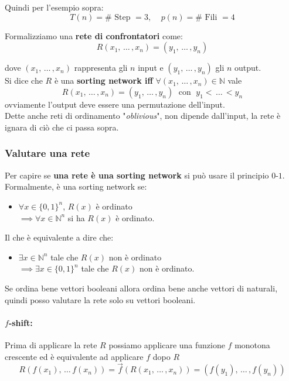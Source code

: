 Quindi per l'esempio sopra:
$$ T(n) = \# \text{ Step } = 3, \;\;\;\; p(n) = \# \text{ Fili } = 4 $$

Formalizziamo una \textbf{rete di confrontatori} come: 
$$ R (x_1, \, \dots \, , x_n) = (y_1, \, \dots \, , y_n) $$

dove $(x_1, \, \dots \, , x_n)$ rappresenta gli $n$ input e $(y_1, \, \dots \, , y_n)$ gli $n$ output.\\

Si dice che $R$ è una \textbf{sorting network iff} $\forall (x_1, \, \dots \, , x_n) \in \mathbb{N}$ vale 
$$ R (x_1, \, \dots \, , x_n) = (y_1, \, \dots \, , y_n) \; \text{ con } \; y_1 < \, \dots \, < y_n $$
ovviamente l'output deve essere una permutazione dell'input.\\

Dette anche reti di ordinamento "\textit{oblivious}", non dipende dall'input, la rete è ignara di ciò che ci passa sopra.\\

\newpage

\subsubsection{Valutare una rete}

Per capire se \textbf{una rete è una sorting network} si può usare il principio $0$-$1$.\\

Formalmente, è una sorting network se: 
\begin{itemize}
	\item $\forall x \in \{0,1\}^n$, $R(x)$ è ordinato\\
	$\implies \forall x \in \mathbb{N}^n$ si ha $R(x)$ è ordinato.\\
\end{itemize}

Il che è equivalente a dire che:
\begin{itemize}
	\item $\exists x \in \mathbb{N}^n$ tale che $R(x)$ non è ordinato\\
	$\implies \exists x \in \{0,1\}^n$ tale che $R(x)$ non è ordinato.\\
\end{itemize}

Se ordina bene vettori booleani allora ordina bene anche vettori di naturali, quindi posso valutare la rete solo su vettori booleani.\\

\paragraph{$f$-shift:} Prima di applicare la rete $R$ possiamo applicare una funzione $f$ monotona crescente ed è equivalente ad applicare $f$ dopo $R$
$$ R \left(f(x_1), \, \dots \, f(x_n)\right) = \vec{f}\left(R(x_1, \, \dots \, , x_n)\right) = \left(f(y_1), \, \dots \, , f(y_n) \right) $$

